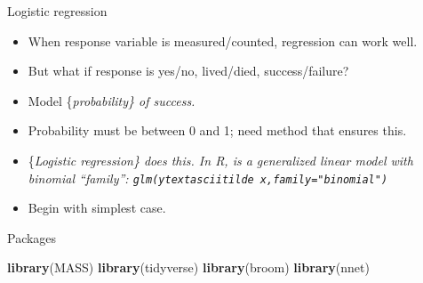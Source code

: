 \documentclass[ignorenonframetext,]{beamer}
\newenvironment{Shaded}{\begin{snugshade}}{\end{snugshade}}
\newcommand{\KeywordTok}[1]{\textcolor[rgb]{0.13,0.29,0.53}{\textbf{#1}}}
\newcommand{\NormalTok}[1]{#1}
\begin{document}
\begin{frame}[fragile]{Logistic regression}
\protect\hypertarget{logistic-regression}{}

\begin{itemize}
\item
  When response variable is measured/counted, regression can work well.
\item
  But what if response is yes/no, lived/died, success/failure?
\item
  Model \{\em probability\} of success.
\item
  Probability must be between 0 and 1; need method that ensures this.
\item
  \{\em Logistic regression\} does this. In R, is a \emph{generalized
  linear model} with binomial ``family'':
  \texttt{glm(ytextasciitilde\ x,family="binomial")}
\item
  Begin with simplest case.
\end{itemize}

\end{frame}

\begin{frame}[fragile]{Packages}
\protect\hypertarget{packages-1}{}

\begin{Shaded}
\begin{Highlighting}[]
\KeywordTok{library}\NormalTok{(MASS)}
\KeywordTok{library}\NormalTok{(tidyverse)}
\KeywordTok{library}\NormalTok{(broom)}
\KeywordTok{library}\NormalTok{(nnet)}
\end{Highlighting}
\end{Shaded}

\end{frame}
\end{document}
